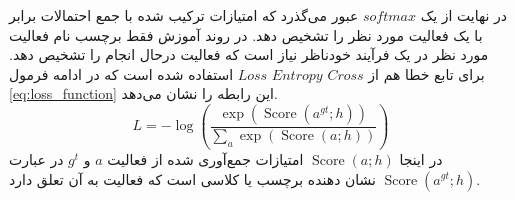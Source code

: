    در نهایت از یک %
   $softmax$
   عبور می‌گذرد که امتیازات ترکیب شده با جمع احتمالات برابر با یک فعالیت مورد نظر را تشخیص دهد. در روند آموزش فقط برچسب نام فعالیت مورد نظر در یک فرآیند خودناظر نیاز است که فعالیت درحال انجام را تشخیص دهد. برای تابع خطا هم از %
   $Cross$ $Entropy$ $Loss$
    استفاده شده است که در ادامه فرمول %
   \ref{eq:loss_function}
   این رابطه را نشان می‌دهد.
   \begin{equation}
   	\label{eq:loss_function}
   	L=-\log \left(\frac{\exp \left(\operatorname{Score}\left(a^{g t} ; h\right)\right)}{\sum_a \exp (\operatorname{Score}(a ; h))}\right)
   \end{equation}
   در اینجا %
    $\operatorname{Score}(a ; h)$
   امتیازات جمع‌آوری شده از فعالیت %
   $a$
   و %
   $g^t$
    در عبارت %
   $\operatorname{Score}\left(a^{g t} ; h\right)$
  نشان دهنده برچسب یا کلاسی است که فعالیت به آن تعلق دارد.